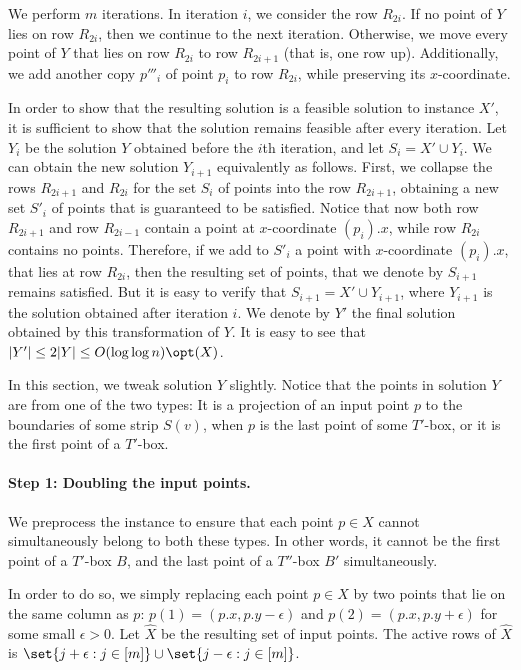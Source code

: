\documentclass[11pt]{article}
\numberwithin{equation}{section}
\theoremstyle{definition}
\theoremstyle{plain}
\begin{document}
We perform $m$ iterations. In iteration $i$, we consider the row $R_{2i}$. If no point of $Y$ lies on row $R_{2i}$, then we continue to the next iteration. Otherwise, we move every point of $Y$ that lies on row $R_{2i}$ to row $R_{2i+1}$ (that is, one row up). Additionally, we add another copy $p'''_i$ of point $p_i$ to row $R_{2i}$, while preserving its $x$-coordinate.

In order to show that the resulting solution is a feasible solution to instance $X'$, it is sufficient to show that the solution remains feasible after every iteration. Let $Y_i$ be the solution $Y$ obtained before the $i$th iteration, and let $S_i=X'\cup Y_i$. We can obtain the new solution $Y_{i+1}$ equivalently as follows. First, we collapse the rows $R_{2i+1}$ and $R_{2i}$ for the set $S_i$ of points into the row $R_{2i+1}$, obtaining a new set $S'_i$ of points that is guaranteed to be satisfied. Notice that now both row $R_{2i+1}$ and row $R_{2i-1}$ contain a point at $x$-coordinate $(p_i).x$, while row $R_{2i}$ contains no points. Therefore, if we add to $S'_i$ a point with $x$-coordinate $(p_i).x$, that lies at row $R_{2i}$, then the resulting set of points, that we denote by $S_{i+1}$ remains satisfied. But it is easy to verify that $S_{i+1}=X'\cup Y_{i+1}$, where $Y_{i+1}$ is the solution obtained after iteration $i$.
We denote by $Y'$ the final solution obtained by this transformation of $Y$. It is easy to see that $|Y'|\leq 2|Y|\leq O(\log\log n)\opt(X)$.



\iffalse
In this section, we tweak solution $Y$ slightly. 
Notice that the points in solution $Y$ are from one of the two types: It is a projection of an input point $p$ to the boundaries of some strip $S(v)$, when $p$ is the last point of some $T'$-box, or it is the first point of a $T'$-box. 


\paragraph*{Step 1: Doubling the input points.} We preprocess the instance to ensure that each point $p \in X$ cannot simultaneously belong to both these types. In other words, it cannot be the first point of a $T'$-box $B$, and the last point of a $T''$-box $B'$ simultaneously.

In order to do so, we simply replacing each point $p\in X$ by two points that lie on the same column as $p$: $p(1) = (p.x, p.y-\epsilon)$ and $p(2) = (p.x, p.y+\epsilon)$ for some small $\epsilon >0$.  Let $\hat{X}$ be the resulting set of input points. The active rows of $\hat{X}$ is $\set{j + \epsilon: j \in [m]}\cup \set{j-\epsilon: j \in [m]}$.  
\end{document}
